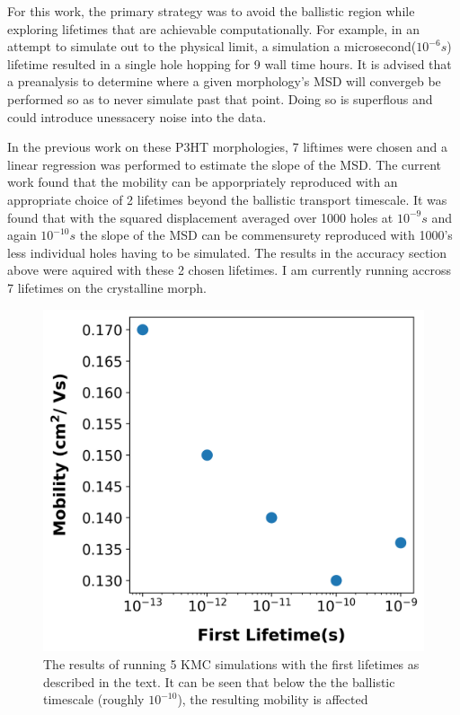 For this work, the primary strategy was to avoid the ballistic region while exploring lifetimes
that are achievable computationally. For example, in an attempt to simulate out to the physical limit, a
simulation a microsecond($10^{-6}s$) lifetime resulted in a single hole hopping for 9 wall time hours.
It is advised that a preanalysis to determine where a given morphology's MSD will convergeb be performed so as
to never simulate past that point. Doing so is superflous and could introduce unessacery noise into the data. 

In the previous work on these P3HT morphologies, 7 liftimes were chosen and a linear regression was performed
to estimate the slope of the MSD. The current work found that the mobility can be apporpriately reproduced
with an appropriate choice of 2 lifetimes beyond the ballistic transport timescale. It was found that with the 
squared displacement averaged over 1000 holes at $10^{-9}s$ and again $10^{-10}s$ the slope of the MSD can be
commensurety reproduced with 1000's less individual holes having to be simulated. The results in the accuracy
section above were aquired with these 2 chosen lifetimes. I am currently running accross 7 lifetimes on the
crystalline morph. 

\begin{figure}
  \center
  \includegraphics[width=0.8\linewidth]{figures/lifetime.png} 
    \caption{The results of running 5 KMC simulations with the first lifetimes as described in the text. It
    can be seen that below the the ballistic timescale (roughly $10^{-10}$), the resulting mobility is affected}
  \label{lifetime}
\end{figure}

